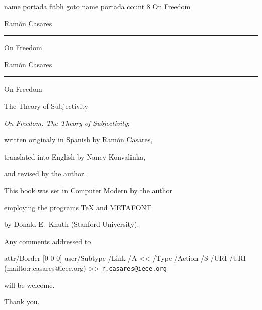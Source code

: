 

\ifx\pdfliteral\undefined\else
 \begingroup\corkfont
 \endgroup
\fi


\pdfcode
\pdfdest name {portada} fitbh
\pdfoutline goto name {portada} count 8 {On Freedom}
\pdfendcode


\centerline{\fontone Ramón Casares}
\vskip1pc
\hrule height 1pt
\vskip1.5pc
\centerline{\fontzero On Freedom}

\vfill\break %

\null

\vfill\break %

\centerline{\fontone Ramón Casares}
\vskip1pc
\hrule height 1pt
\vskip1.5pc
\centerline{\fontzero On Freedom}
\vskip1pc
\centerline{\fontone The Theory of Subjectivity}

\vfill\break %

\null

 {\sl On Freedom: The Theory of Subjectivity};\par
 written originaly in Spanish by Ram\'on Casares,\par
 translated into English by Nancy Konvalinka,\par
 and revised by the author.\par

 \null

 This book was set in Computer Modern by the author\par
 employing the programs {\TeX} and {\logo METAFONT}\par
 by Donald E.~Knuth (Stanford University).\par



\vfill

 Any comments addressed to\par
 \indent\pdfcode \pdfstartlink attr{/Border [0 0 0]}
   user{/Subtype /Link /A << /Type /Action
    /S /URI /URI (mailto:r.casares@ieee.org) >>}\pdfendcode
  {\tt r.casares@ieee.org}\pdfcode \pdfendlink \pdfendcode\par
 will be welcome.\par
 Thank you.

\vglue 2pc

